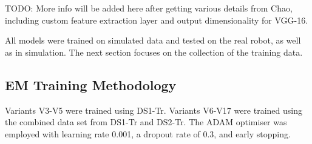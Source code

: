 TODO: More info will be added here after getting various details from Chao, including custom feature extraction layer and output dimensionality for VGG-16.

All models were trained on simulated data and tested on the real robot, as well as in simulation. The next section focuses on the collection of the training data.

\subsection{EM Training Methodology}
Variants V3-V5 were trained using DS1-Tr. Variants V6-V17 were trained using the combined data set from DS1-Tr and DS2-Tr. The ADAM optimiser was employed with learning rate 0.001, a dropout rate of 0.3, and early stopping.